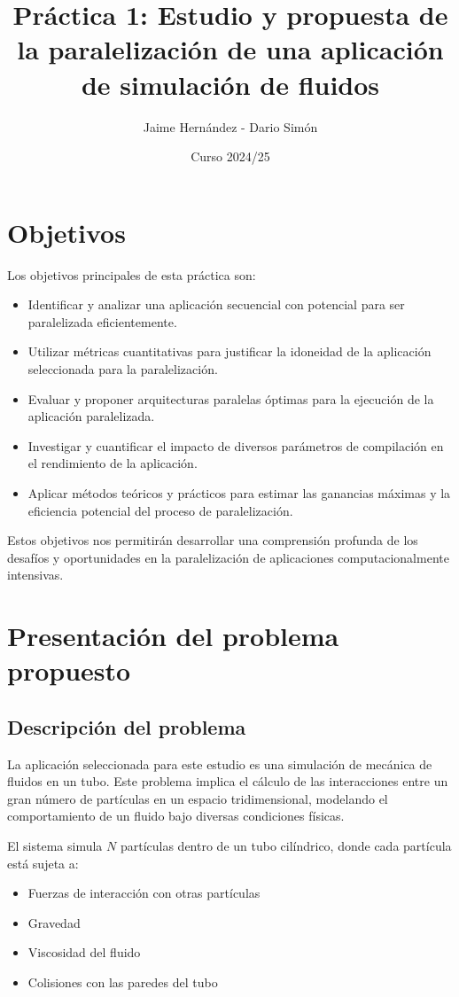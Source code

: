 \documentclass[12pt,a4paper]{article}
\title{Práctica 1: Estudio y propuesta de la paralelización de una aplicación de simulación de fluidos}
\author{Jaime Hernández - Dario Simón}
\date{Curso 2024/25}
\begin{document}
	
	\maketitle
	
	\newpage
		
	\tableofcontents
	
	\newpage
	
	\section{Objetivos}
	Los objetivos principales de esta práctica son:
	\begin{itemize}
		\item Identificar y analizar una aplicación secuencial con potencial para ser paralelizada eficientemente.
		\item Utilizar métricas cuantitativas para justificar la idoneidad de la aplicación seleccionada para la paralelización.
		\item Evaluar y proponer arquitecturas paralelas óptimas para la ejecución de la aplicación paralelizada.
		\item Investigar y cuantificar el impacto de diversos parámetros de compilación en el rendimiento de la aplicación.
		\item Aplicar métodos teóricos y prácticos para estimar las ganancias máximas y la eficiencia potencial del proceso de paralelización.
	\end{itemize}
	
	Estos objetivos nos permitirán desarrollar una comprensión profunda de los desafíos y oportunidades en la paralelización de aplicaciones computacionalmente intensivas.
	
	\newpage
	
	\section{Presentación del problema propuesto}
	\subsection{Descripción del problema}
	La aplicación seleccionada para este estudio es una simulación de mecánica de fluidos en un tubo. Este problema implica el cálculo de las interacciones entre un gran número de partículas en un espacio tridimensional, modelando el comportamiento de un fluido bajo diversas condiciones físicas.
	
	El sistema simula $N$ partículas dentro de un tubo cilíndrico, donde cada partícula está sujeta a:
	\begin{itemize}
		\item Fuerzas de interacción con otras partículas
		\item Gravedad
		\item Viscosidad del fluido
		\item Colisiones con las paredes del tubo
	\end{itemize}
	
\end{document}
